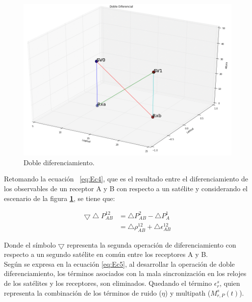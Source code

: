 \begin{figure}[ht]
	\centering
	\includegraphics[scale=0.4]{Imagenes/DoubleDifferencing.png}
	\caption{Doble diferenciamiento.}
	\label{fig:DoubleDifferencing}
\end{figure}

Retomando la ecuación ~\ref{eq:Ec4}, que es el resultado entre el diferenciamiento de los observables de un receptor A y B con respecto a un satélite y considerando el escenario de la figura \textbf{\ref{fig:DoubleDifferencing}}, se tiene que:

\begin{equation}
	\begin{aligned}
		\bigtriangledown\bigtriangleup P_{AB}^{12} 
		& = \bigtriangleup P_{AB}^{2} - \bigtriangleup P_{A}^{1}\\
		& = \bigtriangleup \rho_{AB}^{12} + \bigtriangleup\epsilon_{AB}^{12}
	\label{eq:Ec5}
	\end{aligned}
\end{equation}

Donde el símbolo $\bigtriangledown$ representa la segunda operación de diferenciamiento con respecto a un segundo satélite en común entre los receptores A y B.\\

Según se expresa en la ecuación \ref{eq:Ec5}, al desarrollar la operación de doble diferenciamiento, los términos asociados con la mala sincronización en los relojes de los satélites y los receptores, son eliminados. Quedando el término $\epsilon_{r}^{s}$, quien representa la combinación de los términos de ruido ($\eta$) y multipath ($M_{r,P}^{s}(t)$).

